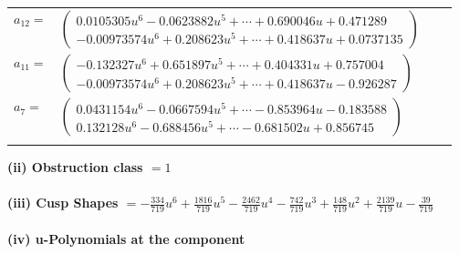 \documentclass[1p]{elsarticle_modified}
\theoremstyle{definition}
\begin{document}
\begin{tabular}{m{7pt} m{180pt} m{7pt} m{180pt} }
\flushright $a_{12}=$&$\begin{pmatrix}0.0105305 u^{6}-0.0623882 u^{5}+\cdots+0.690046 u+0.471289\\-0.00973574 u^{6}+0.208623 u^{5}+\cdots+0.418637 u+0.0737135\end{pmatrix}$ \\
\flushright $a_{11}=$&$\begin{pmatrix}-0.132327 u^{6}+0.651897 u^{5}+\cdots+0.404331 u+0.757004\\-0.00973574 u^{6}+0.208623 u^{5}+\cdots+0.418637 u-0.926287\end{pmatrix}$ \\
\flushright $a_{7}=$&$\begin{pmatrix}0.0431154 u^{6}-0.0667594 u^{5}+\cdots-0.853964 u-0.183588\\0.132128 u^{6}-0.688456 u^{5}+\cdots-0.681502 u+0.856745\end{pmatrix}$\\&\end{tabular}
\flushleft \textbf{(ii) Obstruction class $= 1$}\\~\\
\flushleft \textbf{(iii) Cusp Shapes $= -\frac{334}{719} u^6+\frac{1816}{719} u^5-\frac{2462}{719} u^4-\frac{742}{719} u^3+\frac{148}{719} u^2+\frac{2139}{719} u-\frac{39}{719}$}\\~\\
\newpage\renewcommand{\arraystretch}{1}
\flushleft \textbf{(iv) u-Polynomials at the component}\newline \\
\end{document}

